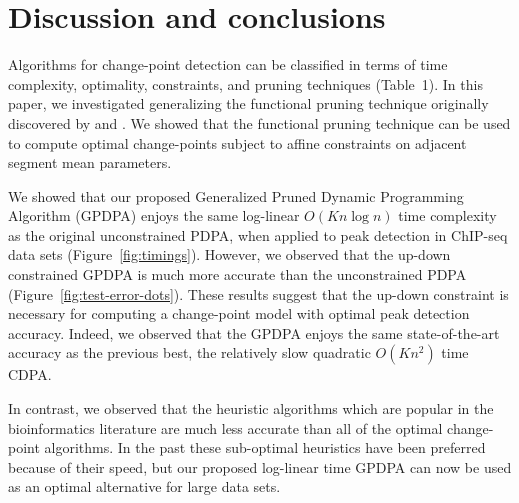 \documentclass{article}
\begin{document}
%   

\section{Discussion and conclusions}
\label{sec:discussion}

Algorithms for change-point detection can be classified in terms of
time complexity, optimality, constraints, and pruning techniques
(Table~1). In this paper, we investigated generalizing the functional
pruning technique originally discovered by \citet{pruned-dp} and
\citet{johnson}. We showed that the functional pruning technique can
be used to compute optimal change-points subject to affine constraints
on adjacent segment mean parameters.

We showed that our proposed Generalized Pruned Dynamic Programming
Algorithm (GPDPA) enjoys the same log-linear $O(Kn\log n)$ time
complexity as the original unconstrained PDPA, when applied to peak
detection in ChIP-seq data sets (Figure~\ref{fig:timings}). However,
we observed that the up-down constrained GPDPA is much more accurate
than the unconstrained PDPA (Figure~\ref{fig:test-error-dots}). These
results suggest that the up-down constraint is necessary for computing
a change-point model with optimal peak detection accuracy. Indeed, we
observed that the GPDPA enjoys the same state-of-the-art accuracy as
the previous best, the relatively slow quadratic $O(Kn^2)$ time
CDPA.

In contrast, we observed that the heuristic algorithms which are
popular in the bioinformatics literature are much less accurate than
all of the optimal change-point algorithms. In the past these
sub-optimal heuristics have been preferred because of their speed, but
our proposed log-linear time GPDPA can now be used as an optimal
alternative for large data sets.
\end{document}
